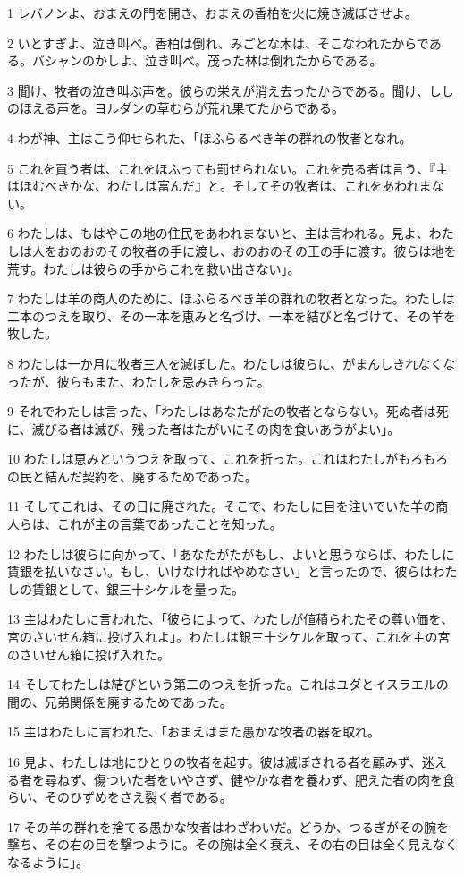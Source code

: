 \par 1 レバノンよ、おまえの門を開き、おまえの香柏を火に焼き滅ぼさせよ。
\par 2 いとすぎよ、泣き叫べ。香柏は倒れ、みごとな木は、そこなわれたからである。バシャンのかしよ、泣き叫べ。茂った林は倒れたからである。
\par 3 聞け、牧者の泣き叫ぶ声を。彼らの栄えが消え去ったからである。聞け、ししのほえる声を。ヨルダンの草むらが荒れ果てたからである。
\par 4 わが神、主はこう仰せられた、「ほふらるべき羊の群れの牧者となれ。
\par 5 これを買う者は、これをほふっても罰せられない。これを売る者は言う、『主はほむべきかな、わたしは富んだ』と。そしてその牧者は、これをあわれまない。
\par 6 わたしは、もはやこの地の住民をあわれまないと、主は言われる。見よ、わたしは人をおのおのその牧者の手に渡し、おのおのその王の手に渡す。彼らは地を荒す。わたしは彼らの手からこれを救い出さない」。
\par 7 わたしは羊の商人のために、ほふらるべき羊の群れの牧者となった。わたしは二本のつえを取り、その一本を恵みと名づけ、一本を結びと名づけて、その羊を牧した。
\par 8 わたしは一か月に牧者三人を滅ぼした。わたしは彼らに、がまんしきれなくなったが、彼らもまた、わたしを忌みきらった。
\par 9 それでわたしは言った、「わたしはあなたがたの牧者とならない。死ぬ者は死に、滅びる者は滅び、残った者はたがいにその肉を食いあうがよい」。
\par 10 わたしは恵みというつえを取って、これを折った。これはわたしがもろもろの民と結んだ契約を、廃するためであった。
\par 11 そしてこれは、その日に廃された。そこで、わたしに目を注いでいた羊の商人らは、これが主の言葉であったことを知った。
\par 12 わたしは彼らに向かって、「あなたがたがもし、よいと思うならば、わたしに賃銀を払いなさい。もし、いけなければやめなさい」と言ったので、彼らはわたしの賃銀として、銀三十シケルを量った。
\par 13 主はわたしに言われた、「彼らによって、わたしが値積られたその尊い価を、宮のさいせん箱に投げ入れよ」。わたしは銀三十シケルを取って、これを主の宮のさいせん箱に投げ入れた。
\par 14 そしてわたしは結びという第二のつえを折った。これはユダとイスラエルの間の、兄弟関係を廃するためであった。
\par 15 主はわたしに言われた、「おまえはまた愚かな牧者の器を取れ。
\par 16 見よ、わたしは地にひとりの牧者を起す。彼は滅ぼされる者を顧みず、迷える者を尋ねず、傷ついた者をいやさず、健やかな者を養わず、肥えた者の肉を食らい、そのひずめをさえ裂く者である。
\par 17 その羊の群れを捨てる愚かな牧者はわざわいだ。どうか、つるぎがその腕を撃ち、その右の目を撃つように。その腕は全く衰え、その右の目は全く見えなくなるように」。

